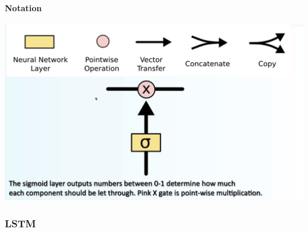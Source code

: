 \documentclass[10pt]{report}
\begin{document}
\paragraph{Notation}\begin{center}
	\includegraphics[scale=0.45]{30.png}
\end{center}
\pagebreak
\subsubsection{LSTM}
\end{document}
